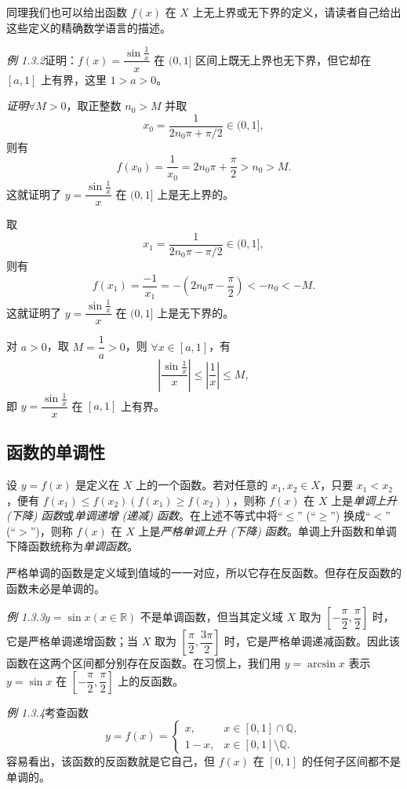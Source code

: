 \documentclass[UTF8,12pt,a4paper,fontset=fandol]{ctexbook}
\begin{document}
同理我们也可以给出函数 $f(x)$ 在 $X$ 上无上界或无下界的定义，请读者自己给出这些定义的精确数学语言的描述。

\noindent\emph{例 1.3.2}\quad 证明：$f(x)=\dfrac{\sin\frac1x}{x}$ 在 $(0,1]$ 区间上既无上界也无下界，但它却在 $[a,1]$ 上有界，这里 $1>a>0$。

\noindent\emph{证明}\quad $\forall M>0$，取正整数 $n_0>M$ 并取
\[
  x_0=\frac{1}{2n_0\pi+\pi/2}\in(0,1],
\]
则有
\[
  f(x_0)=\frac{1}{x_0}=2n_0\pi+\frac{\pi}{2}>n_0>M.
\]
这就证明了 $y=\dfrac{\sin\frac1x}{x}$ 在 $(0,1]$ 上是无上界的。

取
\[
  x_1=\frac{1}{2n_0\pi-\pi/2}\in(0,1],
\]
则有
\[
  f(x_1)=\frac{-1}{x_1}=-\left(2n_0\pi-\frac{\pi}{2}\right)<-n_0<-M.
\]
这就证明了 $y=\dfrac{\sin\frac1x}{x}$ 在 $(0,1]$ 上是无下界的。

对 $a>0$，取 $M=\dfrac1a>0$，则 $\forall x\in[a,1]$，有
\[
  \left|\frac{\sin\frac1x}{x}\right|\leqslant \left|\frac1x\right|\leqslant M,
\]
即 $y=\dfrac{\sin\frac1x}{x}$ 在 $[a,1]$ 上有界。

\subsection{函数的单调性}

设 $y=f(x)$ 是定义在 $X$ 上的一个函数。若对任意的 $x_1,x_2\in X$，只要 $x_1<x_2$，便有 $f(x_1)\leqslant f(x_2)(f(x_1)\geqslant f(x_2))$，则称 $f(x)$ 在 $X$ 上是\emph{单调上升 (下降) 函数}或\emph{单调递增 (递减) 函数}。在上述不等式中将``$\leqslant$'' (``$\geqslant$'') 换成``$<$'' (``$>$'')，则称 $f(x)$ 在 $X$ 上是\emph{严格单调上升 (下降) 函数}。单调上升函数和单调下降函数统称为\emph{单调函数}。

严格单调的函数是定义域到值域的一一对应，所以它存在反函数。但存在反函数的函数未必是单调的。

\noindent\emph{例 1.3.3}\quad $y=\sin x(x\in\mathbb{R})$ 不是单调函数，但当其定义域 $X$ 取为 $\left[-\dfrac\pi2,\dfrac\pi2\right]$ 时，它是严格单调递增函数；当 $X$ 取为 $\left[\dfrac\pi2,\dfrac{3\pi}2\right]$ 时，它是严格单调递减函数。因此该函数在这两个区间都分别存在反函数。在习惯上，我们用 $y=\arcsin x$ 表示 $y=\sin x$ 在 $\left[-\dfrac\pi2,\dfrac\pi2\right]$ 上的反函数。

\noindent\emph{例 1.3.4}\quad 考查函数
\[
  y=f(x)=
  \begin{cases}
    x, & x\in[0,1]\cap\mathbb{Q},\\
    1-x, & x\in[0,1]\setminus\mathbb{Q}.
  \end{cases}
\]
容易看出，该函数的反函数就是它自己，但 $f(x)$ 在 $[0,1]$ 的任何子区间都不是单调的。
\end{document}
